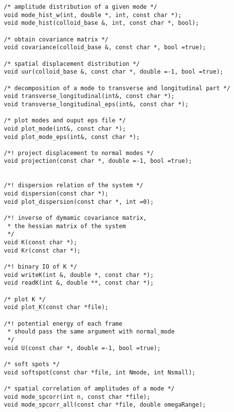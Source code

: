 \begin{verbatim}
/* amplitude distribution of a given mode */
void mode_hist_w(int, double *, int, const char *);
void mode_hist(colloid_base &, int, const char *, bool);

/* obtain covariance matrix */
void covariance(colloid_base &, const char *, bool =true);

/* spatial displacement distribution */
void uur(colloid_base &, const char *, double =-1, bool =true);

/* decomposition of a mode to transverse and longitudinal part */
void transverse_longitudinal(int&, const char *);
void transverse_longitudinal_eps(int&, const char *);

/* plot modes and ouput eps file */
void plot_mode(int&, const char *);
void plot_mode_eps(int&, const char *);

/*! project displacement to normal modes */
void projection(const char *, double =-1, bool =true);


/*! dispersion relation of the system */
void dispersion(const char *);
void plot_dispersion(const char *, int =0);

/*! inverse of dymamic covariance matrix, 
 * the hessian matrix of the system
 */
void K(const char *);
void Kr(const char *);

/*! binary IO of K */
void writeK(int &, double *, const char *);
void readK(int &, double **, const char *);

/* plot K */
void plot_K(const char *file);

/*! potential energy of each frame 
 * should pass the same argument with normal_mode
 */
void U(const char *, double =-1, bool =true);

/* soft spots */
void softspot(const char *file, int Nmode, int Nsmall);

/* spatial correlation of amplitudes of a mode */
void mode_spcorr(int n, const char *file);
void mode_spcorr_all(const char *file, double omegaRange);
\end{verbatim}
